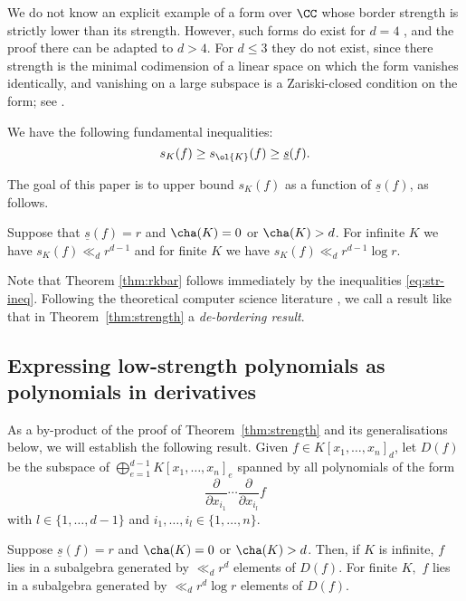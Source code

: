 \documentclass{amsart}
\newcommand{\ul}[1]{\underline{#1}}
\begin{document}
\begin{re}
We do not know an explicit example of a form over $\CC$ whose border
strength is strictly lower than its strength. However, such forms do exist
for $d=4$ \cite{Ballico22}, and the proof there can be adapted to $d >
4$. For $d\leq 3$ they do not exist, since there strength is the minimal
codimension of a linear space on which the form vanishes identically,
and vanishing on a large subspace is a Zariski-closed condition on the
form; see \cite{Derksen17}.
\end{re}

We have the following fundamental inequalities: 
\begin{equation}\label{eq:str-ineq}
    s_K(f)  \geq s_{\ol{K}}(f) \geq \ul{s}(f).
\end{equation}

The goal of this paper is to upper bound $s_K(f)$ as a function of
$\ul{s}(f)$, as follows. 

\begin{thm} \label{thm:strength}
Suppose that $\ul{s}(f) = r$ and $\cha(K)=0$ or $\cha(K)>d$. 
For infinite $K$ we have
$s_K(f) \ll_d r^{d-1}$ and for finite $K$ we have $s_K(f) \ll_d
r^{d-1} \log r$. 
\end{thm}

Note that Theorem \ref{thm:rkbar} follows immediately by the inequalities \eqref{eq:str-ineq}. Following the theoretical computer
science literature \cite{Dutta22}, we call a result like that
in Theorem~\ref{thm:strength} a {\em de-bordering result}.

\subsection{Expressing low-strength polynomials as polynomials in
derivatives}

As a by-product of the proof of Theorem~\ref{thm:strength} and its
generalisations below, we will establish the following result. Given
$f \in K[x_1,\ldots,x_n]_d$, let $D(f)$ be the subspace of
$\bigoplus_{e=1}^{d-1} K[x_1,\ldots,x_n]_e$ spanned by all polynomials
of the form 
\[ \frac{\partial}{\partial x_{i_1}} \cdots \frac{\partial}{\partial
x_{i_l}} f \]
with $l \in \{1,\ldots,d-1\}$ and $i_1,\ldots,i_l \in \{1,\ldots,n\}$. 

\begin{thm} \label{thm:Df}
Suppose $\ul{s}(f) = r$ and $\cha(K)=0$ or $\cha(K)>d$. Then, if $K$ is infinite, 
$f$ lies in a subalgebra generated by $\ll_d r^d$ elements of $D(f)$. For finite $K,$ $f$ lies in a subalgebra generated by $\ll_d r^d\log r $ elements of $D(f).$
\end{thm}
\end{document}
